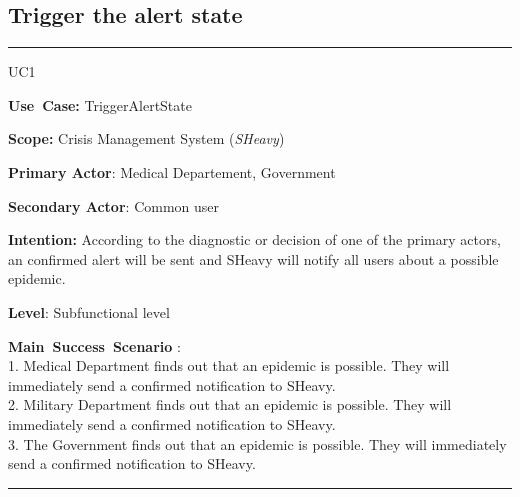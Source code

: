 \subsection{Trigger the alert state}
\vspace{0.5cm}
\hrule
\vspace{0.5cm}
\begin{lyxlist}{UC1}
\small{
\item [\textbf{Use~Case:}] TriggerAlertState
\item [\textbf{Scope:}] Crisis Management System (\emph{SHeavy})
\item [\textbf{Primary Actor}:] Medical Departement, Government
\item [\textbf{Secondary Actor}:] Common user
\item [\textbf{Intention:}] According to the diagnostic or decision of one of
the primary actors, an confirmed alert will be sent and SHeavy will notify all
users about a possible epidemic.
\item [\textbf{Level}:]Subfunctional level
\item [\textbf{Main~Success~Scenario}]:\\
1. Medical Department finds out that an epidemic is possible. They will
immediately send a confirmed notification to SHeavy.\\
2. Military Department finds out that an epidemic is possible. They will
immediately send a confirmed notification to SHeavy.\\
3. The Government finds out that an epidemic is possible. They will
immediately send a confirmed notification to SHeavy.\\
}
\end{lyxlist}
\hrule 
\vspace{0.5cm} 

